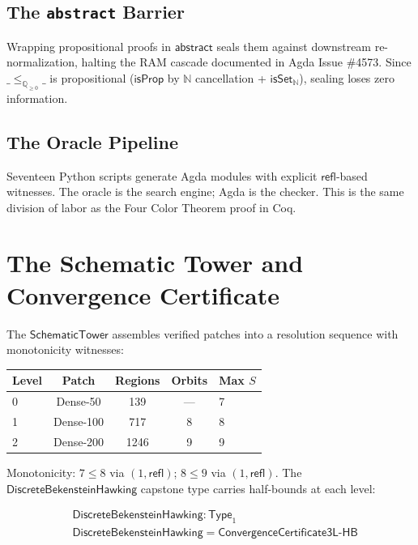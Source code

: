 \documentclass[11pt,a4paper]{article}
\newcommand{\N}{\mathbb{N}}
\newcommand{\Qge}{\mathbb{Q}_{\geq 0}}
\newcommand{\refl}{\mathsf{refl}}
\newcommand{\isSet}{\mathsf{isSet}}
\newcommand{\isProp}{\mathsf{isProp}}
\newcommand{\Type}{\mathsf{Type}}
\begin{document}
\subsection{The \texttt{abstract} Barrier}
Wrapping propositional proofs in $\mathsf{abstract}$ seals them
against downstream re-normalization, halting the RAM cascade
documented in Agda Issue \#4573.  Since $\_\leq_{\Qge}\_$ is
propositional ($\isProp$ by $\N$ cancellation + $\isSet_\N$),
sealing loses zero information.

\subsection{The Oracle Pipeline}
Seventeen Python scripts generate Agda modules with explicit
$\refl$-based witnesses.  The oracle is the search engine; Agda
is the checker.  This is the same division of labor as the Four
Color Theorem proof in Coq.

\section{The Schematic Tower and Convergence Certificate}
\label{sec:tower}

The $\mathsf{SchematicTower}$ assembles verified patches into a
resolution sequence with monotonicity witnesses:

\begin{center}
\begin{tabular}{lcccl}
\toprule
Level & Patch & Regions & Orbits & Max $S$ \\
\midrule
0 & Dense-50  & 139  & --- & 7 \\
1 & Dense-100 & 717  & 8   & 8 \\
2 & Dense-200 & 1246 & 9   & 9 \\
\bottomrule
\end{tabular}
\end{center}

Monotonicity: $7 \leq 8$ via $(1, \refl)$; $8 \leq 9$ via
$(1, \refl)$.  The $\mathsf{DiscreteBekensteinHawking}$ capstone
type carries half-bounds at each level:

\begin{align*}
  &\mathsf{DiscreteBekensteinHawking} : \Type_1 \\
  &\mathsf{DiscreteBekensteinHawking} =
    \mathsf{ConvergenceCertificate3L\text{-}HB}
\end{align*}
\end{document}
